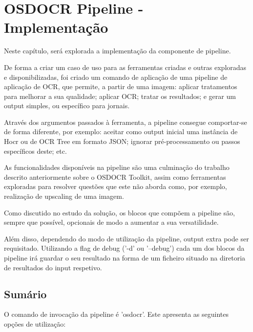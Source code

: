 \chapter{OSDOCR Pipeline - Implementação}
\label{cap_osdocr_pipeline_implementacao}

Neste capítulo, será explorada a implementação da componente de pipeline.

De forma a criar um caso de uso para as ferramentas criadas e outras exploradas e disponibilizadas, foi criado um comando de aplicação de uma pipeline de aplicação de OCR, que permite, a partir de uma imagem: aplicar tratamentos para melhorar a sua qualidade; aplicar OCR; tratar os resultados; e gerar um output simples, ou específico para jornais.

Através dos argumentos passados à ferramenta, a pipeline consegue comportar-se de forma diferente, por exemplo: aceitar como output inicial uma instância de Hocr ou de OCR Tree em formato JSON; ignorar pré-processamento ou passos específicos deste; etc.

As funcionalidades disponíveis na pipeline são uma culminação do trabalho descrito anteriormente sobre o OSDOCR Toolkit, assim como ferramentas exploradas para resolver questões que este não aborda como, por exemplo, realização de upscaling de uma imagem.

Como discutido no estudo da solução, os blocos que compõem a pipeline são, sempre que possível, opcionais de modo a aumentar a sua versatilidade.

Além disso, dependendo do modo de utilização da pipeline, output extra pode ser requisitado. Utilizando a flag de debug ('-d' ou '--debug') cada um dos blocos da pipeline irá guardar o seu resultado na forma de um ficheiro situado na diretoria de resultados do input respetivo. 

\section{Sumário}

O comando de invocação da pipeline é 'osdocr'. Este apresenta as seguintes opções de utilização:

